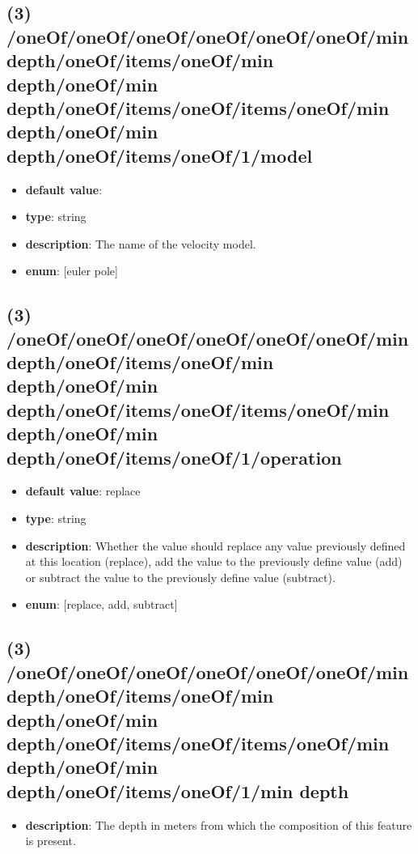 \subsection{(3) /oneOf/oneOf/oneOf/oneOf/oneOf/oneOf/min depth/oneOf/items/oneOf/min depth/oneOf/min depth/oneOf/items/oneOf/items/oneOf/min depth/oneOf/min depth/oneOf/items/oneOf/1/model}
\begin{itemize}[leftmargin=3em]\item {\bf default value}: 
\item {\bf type}: string
\item {\bf description}: The name of the velocity model.
\item {\bf enum}: [euler pole]\end{itemize}\subsection{(3) /oneOf/oneOf/oneOf/oneOf/oneOf/oneOf/min depth/oneOf/items/oneOf/min depth/oneOf/min depth/oneOf/items/oneOf/items/oneOf/min depth/oneOf/min depth/oneOf/items/oneOf/1/operation}
\begin{itemize}[leftmargin=3em]\item {\bf default value}: replace
\item {\bf type}: string
\item {\bf description}: Whether the value should replace any value previously defined at this location (replace), add the value to the previously define value (add) or subtract the value to the previously define value (subtract).
\item {\bf enum}: [replace, add, subtract]\end{itemize}\subsection{(3) /oneOf/oneOf/oneOf/oneOf/oneOf/oneOf/min depth/oneOf/items/oneOf/min depth/oneOf/min depth/oneOf/items/oneOf/items/oneOf/min depth/oneOf/min depth/oneOf/items/oneOf/1/min depth}
\begin{itemize}[leftmargin=3em]\item {\bf description}: The depth in meters from which the composition of this feature is present.
\end{itemize}
